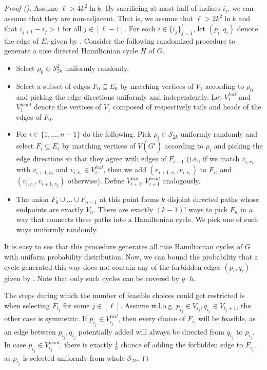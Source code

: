 \documentclass[11pt,a4paper]{article}
\newcommand{\sym}{\mathcal{S}}
\begin{document}
\begin{proof}[Proof ()]
    Assume $\ell > 4k^2 \ln k$. By sacrificing at most half of indices $i_j$, we can assume that they are non-adjacent. That is, we assume that $\ell > 2k^2 \ln k$ and that $i_{j + 1} - i_j > 1$ for all $j \in [\ell - 1]$. For each $i \in \{i_j\}_{j=1}^\ell$, let $(p_i, q_i)$ denote the edge of $E_i$ given by .
    Consider the following randomized procedure to generate a nice directed Hamiltonian cycle $H$ of $G$.
    \begin{itemize}
        \item Select $\rho_0 \in \sym_{2k}^2$ uniformly randomly.
        \item Select a subset of edges $F_0 \subseteq E_0$ by matching vertices of $V_1$ according to $\rho_0$ and picking the edge directions uniformly and independently. Let $V_1^{tail}$ and $V_1^{head}$ denote the vertices of $V_1$ composed of respectively tails and heads of the edges of $F_0$.
        \item For $i \in \{1, \dots, n - 1\}$ do the following. Pick $\rho_i \in \sym_{2k}$ uniformly randomly and select $F_i \subseteq E_i$ by matching vertices of $V(G^i)$ according to $\rho_i$ and picking the edge directions so that they agree with edges of $F_{i - 1}$ (i.e., if we match $v_{i, r_1}$ with $v_{i + 1, r_2}$ and $v_{i, r_1} \in V_i^{tail}$, then we add $(v_{i + 1, r_2}, v_{i, r_1})$ to $F_i$, and $(v_{i, r_1}, v_{i + 1, r_2})$ otherwise). Define $V_{i + 1}^{tail}, V_{i + 1}^{head}$ analogously.
        \item The union $F_0 \cup \dots \cup F_{n - 1}$ at this point forms $k$ disjoint directed paths whose endpoints are exactly $V_n$. There are exactly $(k - 1)!$ ways to pick $F_n$ in a way that connects these paths into a Hamiltonian cycle. We pick one of such ways uniformly randomly.
    \end{itemize}
    It is easy to see that this procedure generates all nice Hamiltonian cycles of $G$ with uniform probability distribution. Now, we can bound the probability that a cycle generated this way does not contain any of the forbidden edges $(p_i, q_i)$ given by . Note that only such cycles can be covered by $g \cdot h$.

    The steps during which the number of feasible choices could get restricted is when selecting $F_{i_j}$ for some $j \in [\ell]$. Assume w.l.o.g. $p_{i_j} \in V_{i_j}, q_{i_j} \in V_{i_j + 1}$, the other case is symmetric. If $p_{i_j} \in V_{i_j}^{tail}$, then every choice of $F_{i_j}$ will be feasible, as an edge between $p_{i_j}, q_{i_j}$ potentially added will always be directed from $q_{i_j}$ to $p_{i_j}$. In case $p_{i_j} \in V_{i_j}^{head}$, there is exactly $\frac{1}{k}$ chance of adding the forbidden edge to $F_{i_j}$, as $\rho_{i_j}$ is selected uniformly from whole $\sym_{2k}$.


\end{proof}
\end{document}
